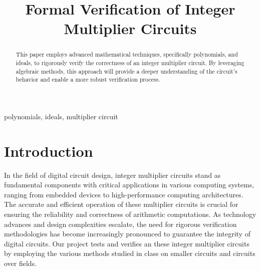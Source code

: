 \documentclass[conference]{IEEEtran}
\begin{document}
\title{Formal Verification of Integer Multiplier Circuits\\}

\author{
\and
{}
\and
{}
\and
{}
}

\maketitle

\begin{abstract}
This paper employs advanced mathematical techniques, specifically polynomials, and ideals, 
to rigorously verify the correctness of an integer multiplier circuit. By leveraging algebraic methods, 
this approach will provide a deeper understanding of the circuit's behavior and enable a more robust 
verification process. 
\end{abstract}

\begin{IEEEkeywords}
polynomials, ideals, multiplier circuit
\end{IEEEkeywords}

\section{Introduction}
In the field of digital circuit design, integer multiplier circuits stand as fundamental components with critical applications in various computing 
systems, ranging from embedded devices to high-performance computing architectures. The accurate and efficient operation of these multiplier 
circuits is crucial for ensuring the reliability and correctness of arithmetic computations. As technology advances and design complexities 
escalate, the need for rigorous verification methodologies has become increasingly pronounced to guarantee the integrity of digital circuits. Our 
project tests and verifies an these integer multiplier circuits by employing the various methods studied in class on smaller circuits and circuits over
fields.
\end{document}
